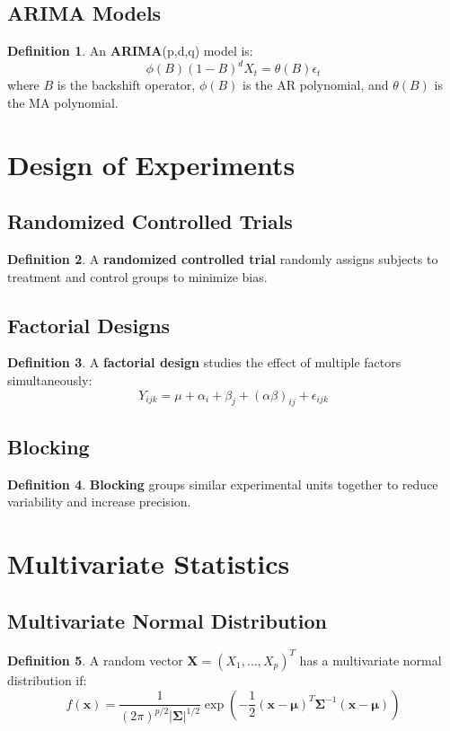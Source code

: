 \documentclass[11pt]{article}
\theoremstyle{definition}
\newtheorem{definition}{Definition}[section]
\begin{document}
\subsection{ARIMA Models}
\begin{definition}
An \textbf{ARIMA}(p,d,q) model is:
$$\phi(B)(1-B)^d X_t = \theta(B)\epsilon_t$$
where $B$ is the backshift operator, $\phi(B)$ is the AR polynomial, and $\theta(B)$ is the MA polynomial.
\end{definition}

\section{Design of Experiments}

\subsection{Randomized Controlled Trials}
\begin{definition}
A \textbf{randomized controlled trial} randomly assigns subjects to treatment and control groups to minimize bias.
\end{definition}

\subsection{Factorial Designs}
\begin{definition}
A \textbf{factorial design} studies the effect of multiple factors simultaneously:
$$Y_{ijk} = \mu + \alpha_i + \beta_j + (\alpha\beta)_{ij} + \epsilon_{ijk}$$
\end{definition}

\subsection{Blocking}
\begin{definition}
\textbf{Blocking} groups similar experimental units together to reduce variability and increase precision.
\end{definition}

\section{Multivariate Statistics}

\subsection{Multivariate Normal Distribution}
\begin{definition}
A random vector $\mathbf{X} = (X_1, \ldots, X_p)^T$ has a multivariate normal distribution if:
$$f(\mathbf{x}) = \frac{1}{(2\pi)^{p/2}|\boldsymbol{\Sigma}|^{1/2}} \exp\left(-\frac{1}{2}(\mathbf{x}-\boldsymbol{\mu})^T\boldsymbol{\Sigma}^{-1}(\mathbf{x}-\boldsymbol{\mu})\right)$$
\end{definition}
\end{document}
